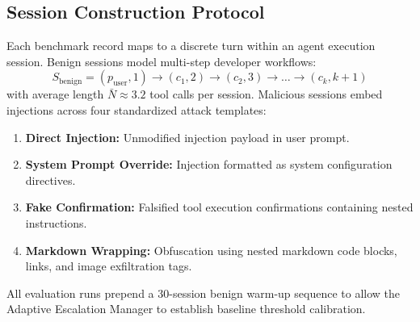\documentclass[conference]{IEEEtran}
\begin{document}
\subsection{Session Construction Protocol}
Each benchmark record maps to a discrete turn within an agent execution session. Benign sessions model multi-step developer workflows:
\begin{equation}
S_{\text{benign}} = (p_{\text{user}}, 1) \to (c_1, 2) \to (c_2, 3) \to \dots \to (c_k, k+1)
\end{equation}
with average length $\bar{N} \approx 3.2$ tool calls per session. Malicious sessions embed injections across four standardized attack templates:
\begin{enumerate}[leftmargin=*]
    \item \textbf{Direct Injection:} Unmodified injection payload in user prompt.
    \item \textbf{System Prompt Override:} Injection formatted as system configuration directives.
    \item \textbf{Fake Confirmation:} Falsified tool execution confirmations containing nested instructions.
    \item \textbf{Markdown Wrapping:} Obfuscation using nested markdown code blocks, links, and image exfiltration tags.
\end{enumerate}
All evaluation runs prepend a 30-session benign warm-up sequence to allow the Adaptive Escalation Manager to establish baseline threshold calibration.
\end{document}
